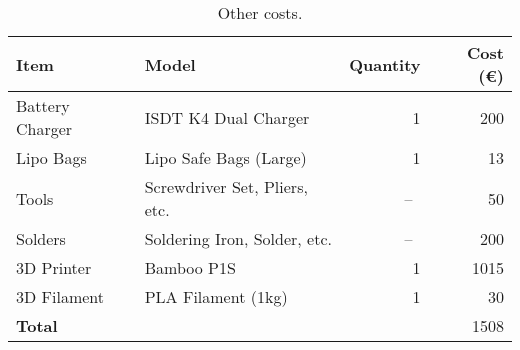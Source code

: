 \begin{table}[H]
    \begin{tabular}{ l l r r }
        \toprule
        \textbf{Item} & \textbf{Model} & \textbf{Quantity} & \textbf{Cost (\euro)} \\
        \midrule
        Battery Charger & ISDT K4 Dual Charger \autocite{rcinnovationsISDTCargador} & 1 & 200 \\
        Lipo Bags & Lipo Safe Bags (Large) \autocite{rcinnovationsBolsaProtectora} & 1 & 13 \\
        Tools & Screwdriver Set, Pliers, etc. &~--~& 50 \\
        Solders & Soldering Iron, Solder, etc. &~--~& 200 \\
        3D Printer & Bamboo P1S \autocite{bambulabBambuPrinter} & 1 & 1015 \\
        3D Filament & PLA Filament (1kg) & 1 & 30 \\
        \midrule
        \textbf{Total} & & & 1508 \\
        \bottomrule
    \end{tabular}
    \caption{Other costs.}\label{tab:other_costs}
\end{table}

